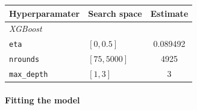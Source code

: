 \documentclass[
]{article}
\begin{document}
\begin{longtable}[]{@{}llc@{}}
\toprule()
\textbf{Hyperparamater} & \textbf{Search space} & \textbf{Estimate} \\
\midrule()
\endhead
\emph{XGBoost} & & \\
\texttt{eta} & \([0,0.5]\) & 0.089492 \\
\texttt{nrounds} & \([75,5000]\) & 4925 \\
\texttt{max\_depth} & \([1,3]\) & 3 \\
\bottomrule()
\end{longtable}

\hypertarget{fitting-the-model}{%
\paragraph{Fitting the model}\label{fitting-the-model}}
\end{document}

